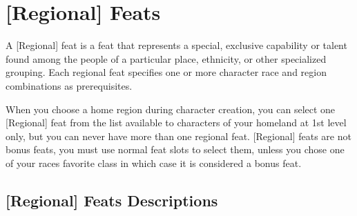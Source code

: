 \section{[Regional] Feats}

A [Regional] feat is a feat that represents a special, exclusive capability or talent found among the people of a particular place, ethnicity, or other specialized grouping. Each regional feat specifies one or more character race and region combinations as prerequisites.

When you choose a home region during character creation, you can select one [Regional] feat from the list available to characters of your homeland at 1st level only, but you can never have more than one regional feat. [Regional] feats are not bonus feats, you must use normal feat slots to select them, unless you chose one of your races favorite class in which case it is considered a bonus feat.

\subsection{[Regional] Feats Descriptions}

